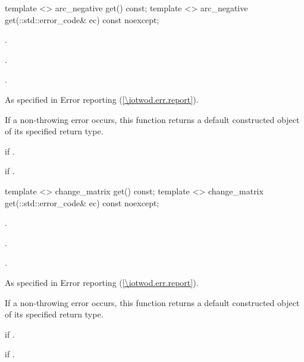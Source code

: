 \begin{itemdecl}
    template <>
    arc_negative get() const;
    template <>
    arc_negative get(::std::error_code& ec) const noexcept;
\end{itemdecl}
\begin{itemdescr}
	\pnum
	\preconditions
	.
	
	\pnum
	.
	
	\pnum
	\returns
	.
	
	\pnum
	\throws
	As specified in Error reporting (\ref{\iotwod.err.report}).
	
	\pnum
	\remarks
	If a non-throwing error occurs, this function returns a default constructed object of its specified return type.
	
	\pnum
	\errors
	 if .
	
	\pnum
	 if .

\end{itemdescr}

\begin{itemdecl}
    template <>
    change_matrix get() const;
    template <>
    change_matrix get(::std::error_code& ec) const noexcept;
\end{itemdecl}
\begin{itemdescr}
	\pnum
	\preconditions
	.
	
	\pnum
	.
	
	\pnum
	\returns
	.
	
	\pnum
	\throws
	As specified in Error reporting (\ref{\iotwod.err.report}).
	
	\pnum
	\remarks
	If a non-throwing error occurs, this function returns a default constructed object of its specified return type.
	
	\pnum
	\errors
	 if .
	
	\pnum
	 if .

\end{itemdescr}

